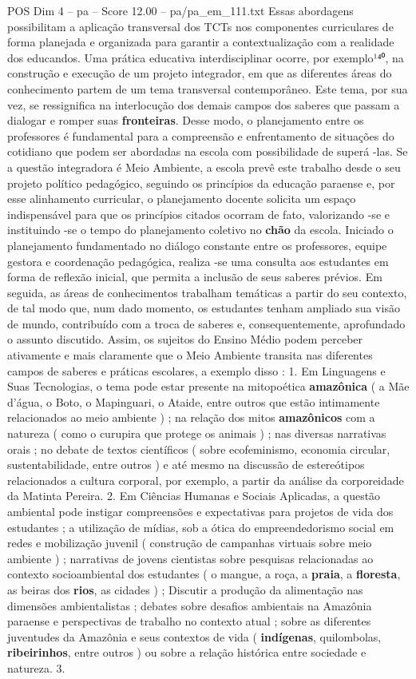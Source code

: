\begin{textsample}{POS Dim 4 – pa – Score 12.00 – pa/pa\_em\_111.txt}
Essas abordagens possibilitam a aplicação transversal dos TCTs nos componentes curriculares de forma planejada e organizada para garantir a contextualização com a realidade dos educandos.
Uma prática educativa interdisciplinar ocorre, por exemplo¹⁴⁰, na construção e execução de um projeto integrador, em que as diferentes áreas do conhecimento partem de um tema transversal contemporâneo.
Este tema, por sua vez, se ressignifica na interlocução dos demais campos dos saberes que passam a dialogar e romper suas \textbf{fronteiras}.
Desse modo, o planejamento entre os professores é fundamental para a compreensão e enfrentamento de situações do cotidiano que podem ser abordadas na escola com possibilidade de superá -las.
Se a questão integradora é Meio Ambiente, a escola prevê este trabalho desde o seu projeto político pedagógico, seguindo os princípios da educação paraense e, por esse alinhamento curricular, o planejamento docente solicita um espaço indispensável para que os princípios citados ocorram de fato, valorizando -se e instituindo -se o tempo do planejamento coletivo no \textbf{chão} da escola.
Iniciado o planejamento fundamentado no diálogo constante entre os professores, equipe gestora e coordenação pedagógica, realiza -se uma consulta aos estudantes em forma de reflexão inicial, que permita a inclusão de seus saberes prévios.
Em seguida, as áreas de conhecimentos trabalham temáticas a partir do seu contexto, de tal modo que, num dado momento, os estudantes tenham ampliado sua visão de mundo, contribuído com a troca de saberes e, consequentemente, aprofundado o assunto discutido.
Assim, os sujeitos do Ensino Médio podem perceber ativamente e mais claramente que o Meio Ambiente transita nas diferentes campos de saberes e práticas escolares, a exemplo disso : 1.
Em Linguagens e Suas Tecnologias, o tema pode estar presente na mitopoética \textbf{amazônica} ( a Mãe d’água, o Boto, o Mapinguari, o Ataide, entre outros que estão intimamente relacionados ao meio ambiente ) ; na relação dos mitos \textbf{amazônicos} com a natureza ( como o curupira que protege os animais ) ; nas diversas narrativas orais ; no debate de textos científicos ( sobre ecofeminismo, economia circular, sustentabilidade, entre outros ) e até mesmo na discussão de estereótipos relacionados a cultura corporal, por exemplo, a partir da análise da corporeidade da Matinta Pereira. 2.
Em Ciências Humanas e Sociais Aplicadas, a questão ambiental pode instigar compreensões e expectativas para projetos de vida dos estudantes ; a utilização de mídias, sob a ótica do empreendedorismo social em redes e mobilização juvenil ( construção de campanhas virtuais sobre meio ambiente ) ; narrativas de jovens cientistas sobre pesquisas relacionadas ao contexto socioambiental dos estudantes ( o mangue, a roça, a \textbf{praia}, a \textbf{floresta}, as beiras dos \textbf{rios}, as cidades ) ; Discutir a produção da alimentação nas dimensões ambientalistas ; debates sobre desafios ambientais na Amazônia paraense e perspectivas de trabalho no contexto atual ; sobre as diferentes juventudes da Amazônia e seus contextos de vida ( \textbf{indígenas}, quilombolas, \textbf{ribeirinhos}, entre outros ) ou sobre a relação histórica entre sociedade e natureza. 3.

\end{textsample}
